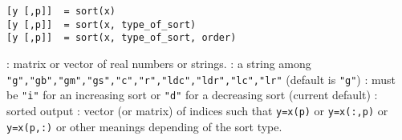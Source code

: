 
\begin{mandesc}
\end{mandesc}

\begin{calling_sequence}
\begin{verbatim}
[y [,p]]  = sort(x)
[y [,p]]  = sort(x, type_of_sort)
[y [,p]]  = sort(x, type_of_sort, order)
\end{verbatim}
\end{calling_sequence}
\begin{parameters}
  \begin{varlist}
    :  matrix or vector of real numbers or strings.
    : a string among
    \verb+"g","gb","gm","gs","c","r","ldc","ldr","lc","lr"+ (default
    is \verb+"g"+)
    : must be \verb+"i"+ for an increasing sort or \verb+"d"+ for a
                    decreasing sort (current default)
    : sorted output
    : vector (or matrix) of indices such that \verb+y=x(p)+
    or  \verb+y=x(:,p)+ or  \verb+y=x(p,:)+ or other meanings
    depending of the sort type.
  \end{varlist}
\end{parameters}

